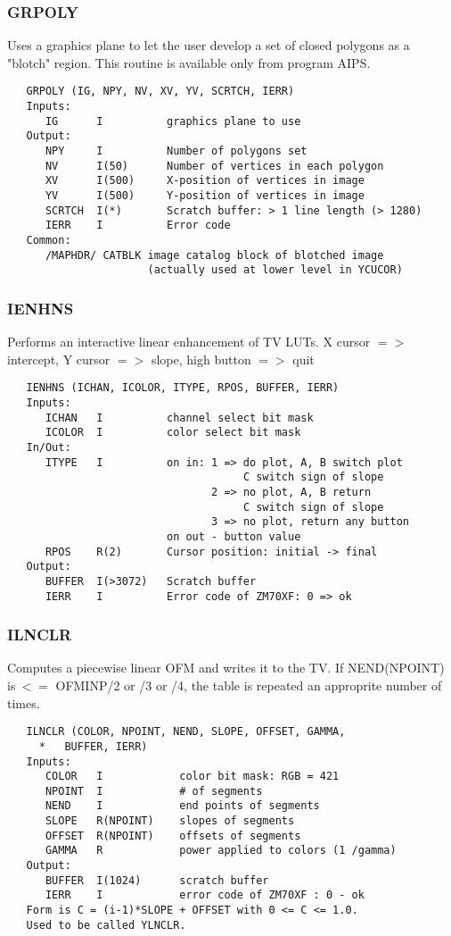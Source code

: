 \subsubsection{GRPOLY}
Uses a graphics plane to let the user develop a set of
closed polygons as a "blotch" region.
This routine is available only from program AIPS.
\begin{verbatim}
   GRPOLY (IG, NPY, NV, XV, YV, SCRTCH, IERR)
   Inputs:
      IG      I          graphics plane to use
   Output:
      NPY     I          Number of polygons set
      NV      I(50)      Number of vertices in each polygon
      XV      I(500)     X-position of vertices in image
      YV      I(500)     Y-position of vertices in image
      SCRTCH  I(*)       Scratch buffer: > 1 line length (> 1280)
      IERR    I          Error code
   Common:
      /MAPHDR/ CATBLK image catalog block of blotched image
                      (actually used at lower level in YCUCOR)
\end{verbatim}

\subsubsection{IENHNS}
Performs an interactive linear enhancement of TV LUTs.
X cursor $=>$ intercept, Y cursor $=>$ slope, high button $=>$ quit
\begin{verbatim}
   IENHNS (ICHAN, ICOLOR, ITYPE, RPOS, BUFFER, IERR)
   Inputs:
      ICHAN   I          channel select bit mask
      ICOLOR  I          color select bit mask
   In/Out:
      ITYPE   I          on in: 1 => do plot, A, B switch plot
                                     C switch sign of slope
                                2 => no plot, A, B return
                                     C switch sign of slope
                                3 => no plot, return any button
                         on out - button value
      RPOS    R(2)       Cursor position: initial -> final
   Output:
      BUFFER  I(>3072)   Scratch buffer
      IERR    I          Error code of ZM70XF: 0 => ok
\end{verbatim}

\subsubsection{ILNCLR}
Computes a piecewise linear OFM and writes it to the TV.
If NEND(NPOINT) is$\ <=$ OFMINP/2 or /3 or /4, the table is repeated
an approprite number of times.
\begin{verbatim}
   ILNCLR (COLOR, NPOINT, NEND, SLOPE, OFFSET, GAMMA,
     *   BUFFER, IERR)
   Inputs:
      COLOR   I            color bit mask: RGB = 421
      NPOINT  I            # of segments
      NEND    I            end points of segments
      SLOPE   R(NPOINT)    slopes of segments
      OFFSET  R(NPOINT)    offsets of segments
      GAMMA   R            power applied to colors (1 /gamma)
   Output:
      BUFFER  I(1024)      scratch buffer
      IERR    I            error code of ZM70XF : 0 - ok
   Form is C = (i-1)*SLOPE + OFFSET with 0 <= C <= 1.0.
   Used to be called YLNCLR.
\end{verbatim}

